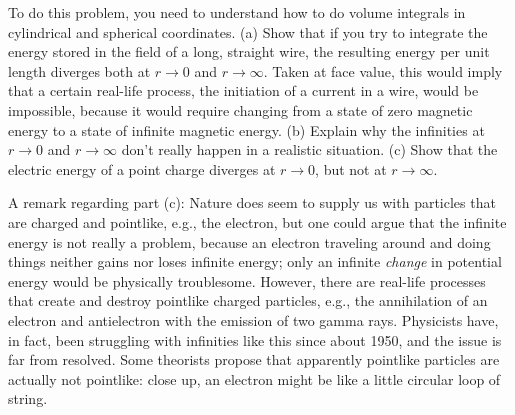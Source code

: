  To do this problem, you need to understand how to do
volume integrals in cylindrical and spherical coordinates.
(a) Show that if you try to integrate the energy stored in
the field of a long, straight wire, the resulting energy per
unit length diverges both at $r\rightarrow 0$ and $r\rightarrow \infty$.
Taken at face value, this would imply that a certain
real-life process, the initiation of a current in a wire,
would be impossible, because it would require changing from
a state of zero magnetic energy to a state of infinite
magnetic energy. (b) Explain why the infinities at
$r\rightarrow 0$ and $r\rightarrow \infty$ don't really happen
in a realistic situation. (c) Show that the electric energy
of a point charge diverges at $r\rightarrow 0$, but not at
$r\rightarrow \infty$.

A remark regarding part (c): Nature does seem to supply us
with particles that are charged and pointlike, e.g., the
electron, but one could argue that the infinite energy is
not really a problem, because an electron traveling around
and doing things neither gains nor loses infinite energy;
only an infinite \emph{change} in potential energy would be
physically troublesome. However, there are real-life
processes that create and destroy pointlike charged
particles, e.g., the annihilation of an electron and
antielectron with the emission of two gamma rays. Physicists
have, in fact, been struggling with infinities like this
since about 1950, and the issue is far from resolved. Some
theorists propose that apparently pointlike particles are
actually not pointlike: close up, an electron might be like
a little circular loop of string.
